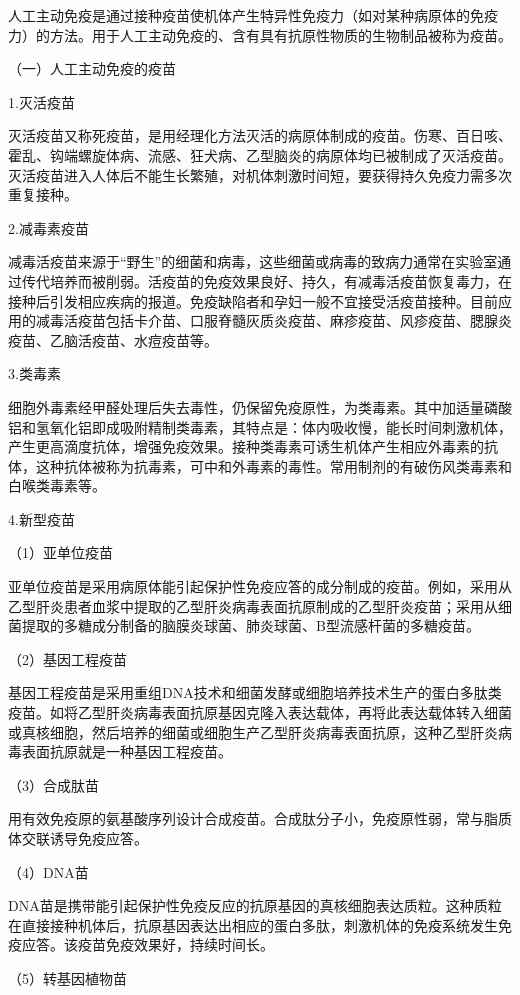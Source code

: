 人工主动免疫是通过接种疫苗使机体产生特异性免疫力（如对某种病原体的免疫力）的方法。用于人工主动免疫的、含有具有抗原性物质的生物制品被称为疫苗。

（一）人工主动免疫的疫苗

1.灭活疫苗

灭活疫苗又称死疫苗，是用经理化方法灭活的病原体制成的疫苗。伤寒、百日咳、霍乱、钩端螺旋体病、流感、狂犬病、乙型脑炎的病原体均已被制成了灭活疫苗。灭活疫苗进入人体后不能生长繁殖，对机体刺激时间短，要获得持久免疫力需多次重复接种。

2.减毒素疫苗

减毒活疫苗来源于“野生”的细菌和病毒，这些细菌或病毒的致病力通常在实验室通过传代培养而被削弱。活疫苗的免疫效果良好、持久，有减毒活疫苗恢复毒力，在接种后引发相应疾病的报道。免疫缺陷者和孕妇一般不宜接受活疫苗接种。目前应用的减毒活疫苗包括卡介苗、口服脊髓灰质炎疫苗、麻疹疫苗、风疹疫苗、腮腺炎疫苗、乙脑活疫苗、水痘疫苗等。

3.类毒素

细胞外毒素经甲醛处理后失去毒性，仍保留免疫原性，为类毒素。其中加适量磷酸铝和氢氧化铝即成吸附精制类毒素，其特点是：体内吸收慢，能长时间刺激机体，产生更高滴度抗体，增强免疫效果。接种类毒素可诱生机体产生相应外毒素的抗体，这种抗体被称为抗毒素，可中和外毒素的毒性。常用制剂的有破伤风类毒素和白喉类毒素等。

4.新型疫苗

（1）亚单位疫苗

亚单位疫苗是采用病原体能引起保护性免疫应答的成分制成的疫苗。例如，采用从乙型肝炎患者血浆中提取的乙型肝炎病毒表面抗原制成的乙型肝炎疫苗；采用从细菌提取的多糖成分制备的脑膜炎球菌、肺炎球菌、B型流感杆菌的多糖疫苗。

（2）基因工程疫苗

基因工程疫苗是采用重组DNA技术和细菌发酵或细胞培养技术生产的蛋白多肽类疫苗。如将乙型肝炎病毒表面抗原基因克隆入表达载体，再将此表达载体转入细菌或真核细胞，然后培养的细菌或细胞生产乙型肝炎病毒表面抗原，这种乙型肝炎病毒表面抗原就是一种基因工程疫苗。

（3）合成肽苗

用有效免疫原的氨基酸序列设计合成疫苗。合成肽分子小，免疫原性弱，常与脂质体交联诱导免疫应答。

（4）DNA苗

DNA苗是携带能引起保护性免疫反应的抗原基因的真核细胞表达质粒。这种质粒在直接接种机体后，抗原基因表达出相应的蛋白多肽，刺激机体的免疫系统发生免疫应答。该疫苗免疫效果好，持续时间长。

（5）转基因植物苗

